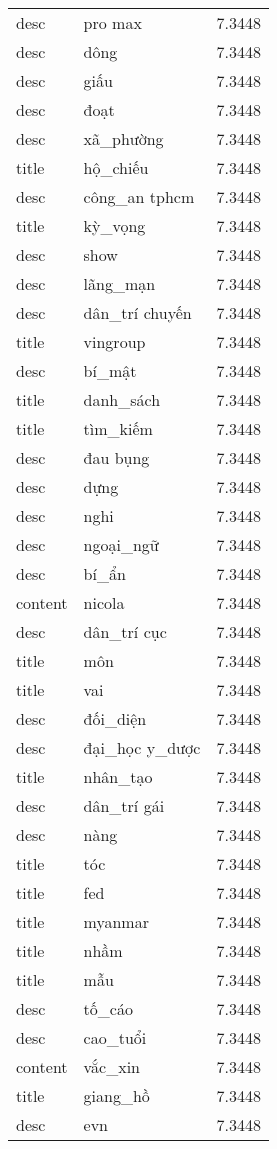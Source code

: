 \documentclass{article}
\begin{document}
\begin{tabular}{lll}
desc & pro max & 7.3448\\
desc & dông & 7.3448\\
desc & giấu & 7.3448\\
desc & đoạt & 7.3448\\
desc & xã\_phường & 7.3448\\
title & hộ\_chiếu & 7.3448\\
desc & công\_an tphcm & 7.3448\\
title & kỳ\_vọng & 7.3448\\
desc & show & 7.3448\\
desc & lãng\_mạn & 7.3448\\
desc & dân\_trí chuyến & 7.3448\\
title & vingroup & 7.3448\\
desc & bí\_mật & 7.3448\\
title & danh\_sách & 7.3448\\
title & tìm\_kiếm & 7.3448\\
desc & đau bụng & 7.3448\\
desc & dựng & 7.3448\\
desc & nghi & 7.3448\\
desc & ngoại\_ngữ & 7.3448\\
desc & bí\_ẩn & 7.3448\\
content & nicola & 7.3448\\
desc & dân\_trí cục & 7.3448\\
title & môn & 7.3448\\
title & vai & 7.3448\\
desc & đối\_diện & 7.3448\\
desc & đại\_học y\_dược & 7.3448\\
title & nhân\_tạo & 7.3448\\
desc & dân\_trí gái & 7.3448\\
desc & nàng & 7.3448\\
title & tóc & 7.3448\\
title & fed & 7.3448\\
title & myanmar & 7.3448\\
title & nhầm & 7.3448\\
title & mẫu & 7.3448\\
desc & tố\_cáo & 7.3448\\
desc & cao\_tuổi & 7.3448\\
content & vắc\_xin & 7.3448\\
title & giang\_hồ & 7.3448\\
desc & evn & 7.3448\\

\end{tabular}
\end{document}
